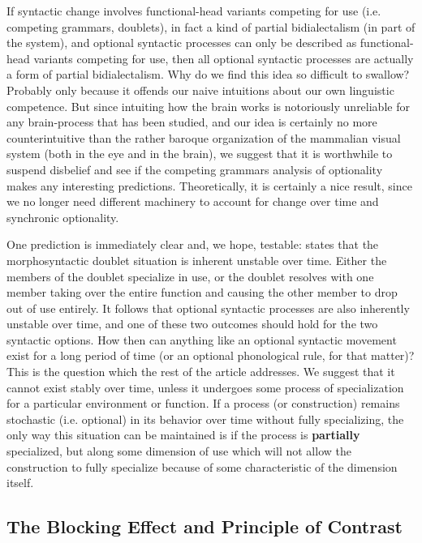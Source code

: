 If syntactic change involves functional-head variants competing for use (i.e. competing grammars, doublets), in fact a kind of partial bidialectalism (in part of the system), and optional syntactic processes can only be described as functional-head variants competing for use, then all optional syntactic processes are actually a form of partial bidialectalism. Why do we find this idea so difficult to swallow? Probably only because it offends our naive intuitions about our own linguistic competence. But since intuiting how the brain works is notoriously unreliable for any brain-process that has been studied, and our idea is certainly no more counterintuitive than the rather baroque organization of the mammalian visual system (both in the eye and in the brain), we suggest that it is worthwhile to suspend disbelief and see if the competing grammars analysis of optionality makes any interesting predictions. Theoretically, it is certainly a nice result, since we no longer need different machinery to account for change over time and synchronic optionality. 

One prediction is immediately clear and, we hope, testable: \citet{kroch1989,kroch1994} states that the morphosyntactic doublet situation is inherent unstable over time. Either the members of the doublet specialize in use, or the doublet resolves with one member taking over the entire function and causing the other member to drop out of use entirely. It follows that optional syntactic processes are also inherently unstable over time, and one of these two outcomes should hold for the two syntactic options. How then can anything like an optional syntactic movement exist for a long period of time (or an optional phonological rule, for that matter)? This is the question which the rest of the article addresses. We suggest that it cannot exist stably over time, unless it undergoes some process of specialization for a particular environment or function. If a process (or construction) remains stochastic (i.e. optional) in its behavior over time without fully specializing, the only way this situation can be maintained is if the process is \textbf{partially} specialized, but along some dimension of use which will not allow the construction to fully specialize because of some characteristic of the dimension itself.

\subsection{The Blocking Effect and Principle of Contrast}

